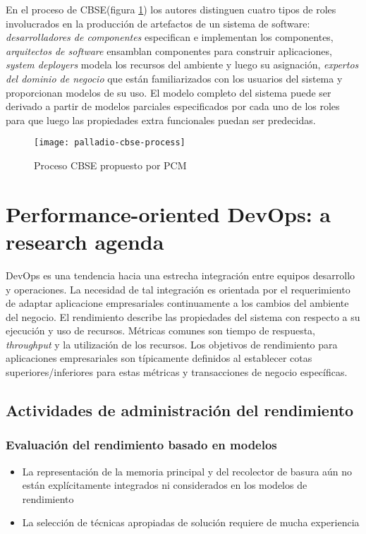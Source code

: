 En el proceso de CBSE(figura \ref{fig:palladio-cbse}) los autores distinguen cuatro tipos de roles involucrados en la producción de artefactos de un sistema de software: \emph{desarrolladores de componentes} especifican e implementan los componentes, \emph{arquitectos de software} ensamblan componentes para construir aplicaciones, \emph{system deployers} modela los recursos del ambiente y luego su asignación, \emph{expertos del dominio de negocio} que están familiarizados con los usuarios del sistema y proporcionan modelos de su uso. El modelo completo del sistema puede ser derivado a partir de modelos parciales especificados por cada uno de los roles para que luego las propiedades extra funcionales puedan ser predecidas.

\begin{figure}[h!]
  \texttt{[image: palladio-cbse-process]}
  \caption{Proceso CBSE propuesto por PCM}
  \label{fig:palladio-cbse}
\end{figure} 


\newpage
\section{Performance-oriented DevOps: a research agenda\cite{performance-devops}}
DevOps es una tendencia hacia una estrecha integración entre equipos desarrollo y operaciones. La necesidad de tal integración es orientada por el requerimiento de adaptar aplicacione empresariales continuamente a los cambios del ambiente del negocio. El rendimiento describe las propiedades del sistema con respecto a su ejecución y uso de recursos. Métricas comunes son tiempo de respuesta, \emph{throughput} y la utilización de los recursos. Los objetivos de rendimiento para aplicaciones empresariales son típicamente definidos al establecer cotas superiores/inferiores para estas métricas y transacciones de negocio específicas.

\subsection{Actividades de administración del rendimiento}
\subsubsection{Evaluación del rendimiento basado en modelos}
\begin{itemize}
    \item La representación de la memoria principal y del recolector de basura aún no están explícitamente integrados ni considerados en los modelos de rendimiento
    \item La selección de técnicas apropiadas de solución requiere de mucha experiencia
\end{itemize}

